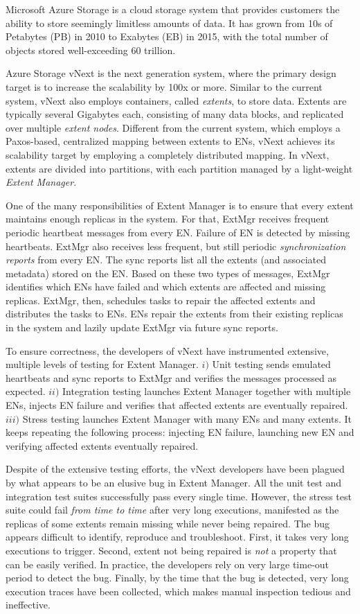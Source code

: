 Microsoft Azure Storage is a cloud storage system that provides customers the ability to store seemingly limitless amounts of data. It has grown from 10s of Petabytes (PB) in 2010 to Exabytes (EB) in 2015, with the total number of objects stored well-exceeding 60 trillion.

Azure Storage vNext is the next generation system, where the primary design target is to increase the scalability by 100x or more. Similar to the current system, vNext also employs containers, called {\em extents}, to store data. Extents are typically several Gigabytes each, consisting of many data blocks, and replicated over multiple {\em extent nodes}. Different from the current system, which employs a Paxos-based, centralized mapping between extents to ENs, vNext achieves its scalability target by employing a completely distributed mapping. In vNext, extents are divided into partitions, with each partition managed by a light-weight {\em Extent Manager}.

One of the many responsibilities of Extent Manager is to ensure that every extent maintains enough replicas in the system. For that, ExtMgr receives frequent periodic heartbeat messages from every EN. Failure of EN is detected by missing heartbeats. ExtMgr also receives less frequent, but still periodic {\em synchronization reports} from every EN. The sync reports list all the extents (and associated metadata) stored on the EN. Based on these two types of messages, ExtMgr identifies which ENs have failed and which extents are affected and missing replicas. ExtMgr, then, schedules tasks to repair the affected extents and distributes the tasks to ENs. ENs repair the extents from their existing replicas in the system and lazily update ExtMgr via future sync reports.

To ensure correctness, the developers of vNext have instrumented extensive, multiple levels of testing for Extent Manager.
$i)$ Unit testing sends emulated heartbeats and sync reports to ExtMgr and verifies the messages processed as expected.
$ii)$ Integration testing launches Extent Manager together with multiple ENs, injects EN failure and verifies that affected extents are eventually repaired.
$iii)$ Stress testing launches Extent Manager with many ENs and many extents. It keeps repeating the following process: injecting EN failure, launching new EN and verifying affected extents eventually repaired.

Despite of the extensive testing efforts, the vNext developers have been plagued by what appears to be an elusive bug in Extent Manager. All the unit test and integration test suites successfully pass every single time. However, the stress test suite could fail {\em from time to time} after very long executions, manifested as the replicas of some extents remain missing while never being repaired. The bug appears difficult to identify, reproduce and troubleshoot. First, it takes very long executions to trigger. Second, extent not being repaired is {\em not} a property that can be easily verified. In practice, the developers rely on very large time-out period to detect the bug. Finally, by the time that the bug is detected, very long execution traces have been collected, which makes manual inspection tedious and ineffective.

